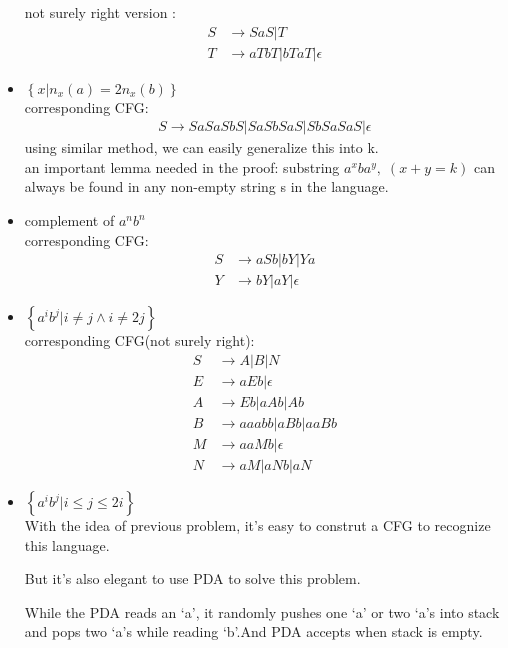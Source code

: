 \documentclass{article}
\begin{document}
\begin{itemize}
            not surely right version : 
            \begin{align*}
                S&\rightarrow SaS | T \\
                T&\rightarrow aTbT | bTaT | \epsilon
            \end{align*}
        \item $\left\{x | n_x(a)=2n_x(b)\right\}$  \\ corresponding CFG:
            \begin{align*}
                S \rightarrow SaSaSbS | SaSbSaS | SbSaSaS | \epsilon
            \end{align*}
            using similar method, we can easily generalize this into k.\\
            an important lemma needed in the proof: substring $a^xba^y,\; (x+y=k)$ can always be found in any non-empty string s in the language.
        \item complement of $a^nb^n$ \\ corresponding CFG:
            \begin{align*}
                S & \rightarrow aSb | bY | Ya \\
                Y & \rightarrow bY | aY | \epsilon
            \end{align*}
        \item $\left\{ a^ib^j | i\neq j \wedge i \neq 2j\right\}$ \\ corresponding CFG(not surely right):
            \begin{align*}
                S & \rightarrow A | B | N\\
                E & \rightarrow aEb | \epsilon\\
                A & \rightarrow Eb | aAb | Ab\\
                B & \rightarrow aaabb | aBb | aaBb \\
                M & \rightarrow aaMb | \epsilon\\
                N & \rightarrow aM | aNb | aN
            \end{align*}

        \item $\left\{ a^ib^j | i \leq j \leq 2i \right\}$ \\ 
            With the idea of previous problem, it's easy to construt a CFG to recognize this language.

            But it's also elegant to use PDA to solve this problem. 
            
            While the PDA reads an `a', it randomly pushes one `a' or two `a's into stack and pops two `a's while reading `b'.And PDA accepts when stack is empty.
            

\end{itemize}
\end{document}
